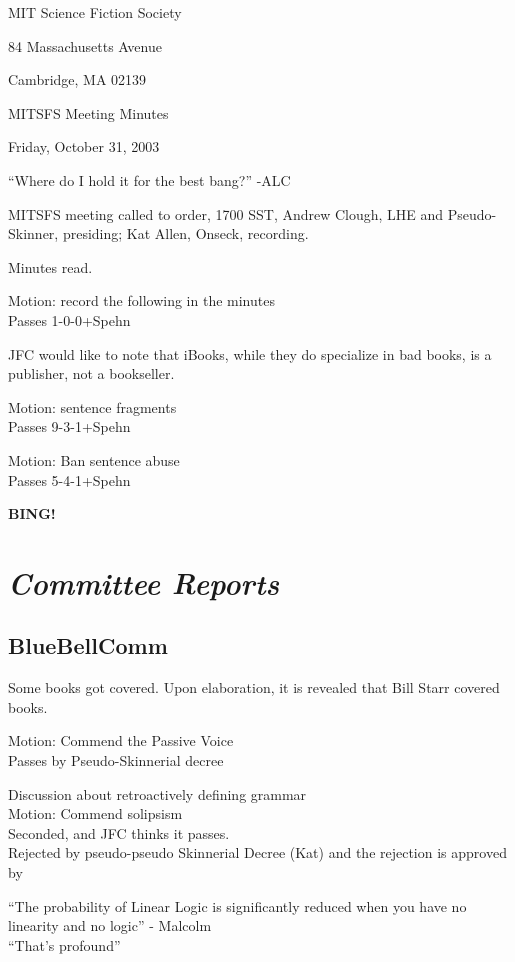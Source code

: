 \documentclass[10pt]{article}
\newcommand{\bing}{{\bf BING!} }
\newcommand{\goto}[1]{\bing \vskip 12pt \section*{{\em{#1}}}}
\begin{document}
\begin{center}

MIT Science Fiction Society 

84 Massachusetts Avenue

Cambridge, MA 02139

\vspace{12pt}

MITSFS Meeting Minutes 

Friday, October 31, 2003

\end{center}
 
\vspace{18pt}

\setlength{\parskip}{6pt}

\noindent
``Where do I hold it for the best bang?'' -ALC

MITSFS meeting called to order, 1700 SST, Andrew Clough, LHE  and
Pseudo-Skinner, presiding; Kat Allen,  Onseck, recording.

Minutes read.

Motion: record the following in the minutes\\
Passes 1-0-0+Spehn

JFC would like to note that iBooks, while they do specialize in bad
books, is a publisher, not a bookseller.

Motion: sentence fragments\\
Passes 9-3-1+Spehn

Motion: Ban sentence abuse\\
Passes 5-4-1+Spehn

\goto{Committee Reports}
\subsection*{BlueBellComm}
Some books got covered. Upon elaboration, it is revealed that Bill
Starr covered books.

Motion: Commend the Passive Voice\\
Passes by Pseudo-Skinnerial decree

Discussion about retroactively defining grammar\\
Motion: Commend solipsism\\
Seconded, and JFC thinks it passes. \\
Rejected by pseudo-pseudo Skinnerial Decree (Kat) and the rejection is
approved by  \BING

``The probability of Linear Logic is significantly reduced when you
have no linearity and no logic'' - Malcolm\\
``That's profound'' 
\end{document}
